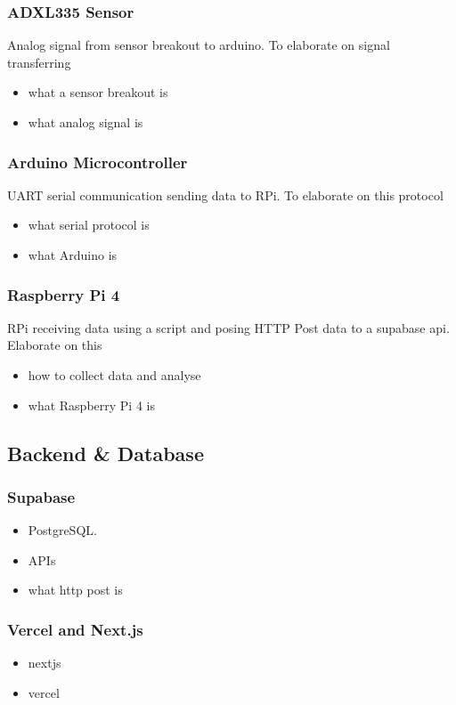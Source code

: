 \subsubsection{ADXL335 Sensor}
Analog signal from sensor breakout to arduino. To elaborate on signal transferring
\begin{itemize}
\item what a sensor breakout is
\item what analog signal is
\end{itemize}


\subsubsection{Arduino Microcontroller}
UART serial communication sending data to RPi. To elaborate on this protocol
\begin{itemize}
\item what serial protocol is
\item what Arduino is
\end{itemize}

\subsubsection{Raspberry Pi 4}
RPi receiving data using a script and posing HTTP Post data to a supabase api. Elaborate on this

\begin{itemize}
\item how to collect data and analyse
\item what Raspberry Pi 4 is
\end{itemize}




\subsection{Backend \& Database}
\subsubsection{Supabase}
\begin{itemize}  
	\item PostgreSQL. 
	\item APIs
	\item what http post is
\end{itemize}  

\subsubsection{Vercel and Next.js}
\begin{itemize}  
	\item nextjs 
	\item vercel
\end{itemize} 